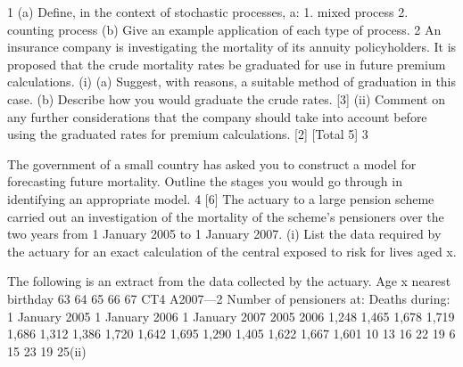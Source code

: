 \documentclass[a4paper,12pt]{article}
\begin{document}
\begin{enumerate}
1
(a)
Define, in the context of stochastic processes, a:
1. mixed process
2. counting process
(b)
Give an example application of each type of process.
2
An insurance company is investigating the mortality of its annuity policyholders. It is
proposed that the crude mortality rates be graduated for use in future premium
calculations.
(i)
(a) Suggest, with reasons, a suitable method of graduation in this case.
(b) Describe how you would graduate the crude rates.
[3]
(ii)
Comment on any further considerations that the company should take into
account before using the graduated rates for premium calculations.
[2]
[Total 5]
3

The government of a small country has asked you to construct a model for forecasting
future mortality.
Outline the stages you would go through in identifying an appropriate model.
4
[6]
The actuary to a large pension scheme carried out an investigation of the mortality of
the scheme’s pensioners over the two years from 1 January 2005 to 1 January 2007.
(i)
List the data required by the actuary for an exact calculation of the central
exposed to risk for lives aged x.

The following is an extract from the data collected by the actuary.
Age x
nearest
birthday
63
64
65
66
67
CT4 A2007—2
Number of pensioners at:
Deaths during:
1 January
2005 1 January
2006 1 January
2007 2005 2006
1,248
1,465
1,678
1,719
1,686 1,312
1,386
1,720
1,642
1,695 1,290
1,405
1,622
1,667
1,601 10
13
16
22
19 6
15
23
19
25(ii)


\end{enumerate}
\end{document}
